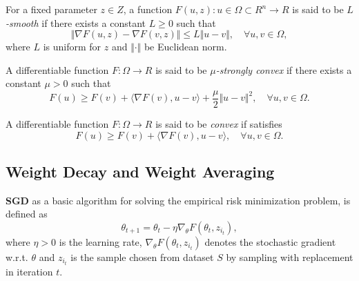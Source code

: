 \begin{definition}[$L$-smooth]
For a fixed parameter $z\in Z$, a function $F(u,z):u\in\Omega \subset R^n \rightarrow R$ is said to be \textit{$L$-smooth} if there exists a constant $L\geq 0$ such that 
    \begin{equation}\label{eq:beta-smooth}
     \Vert\nabla F(u,z)-\nabla F(v,z)\Vert \leq L\Vert u-v\Vert,\quad \forall u, v \in \Omega,
    \end{equation} 
where $L$ is uniform for $z$ and $\Vert\cdot\Vert$ be Euclidean norm.
\end{definition}

\begin{definition}
A differentiable function $F: \Omega \rightarrow R$ is said to be \textit{$\mu$-strongly convex} if there exists a constant $\mu >0$ such that
    \begin{equation}\label{eq:beta-smooth}
     F(u) \geq F(v) + \langle\nabla F(v), u-v \rangle + \frac{\mu}{2} \Vert u-v \Vert^2, \quad \forall u, v \in \Omega.
    \end{equation}   
\end{definition}

\begin{definition}
A differentiable function $F: \Omega \rightarrow R$ is said to be \textit{convex} if satisfies
    \begin{equation}\label{eq:convex-function}
     F(u) \geq F(v) + \langle\nabla F(v), u-v \rangle, \quad \forall u, v \in \Omega.
    \end{equation}  
\end{definition}

\subsection{Weight Decay and Weight Averaging}

\textbf{SGD} as a basic algorithm for solving the empirical risk minimization problem, is defined as 
\begin{equation}\label{SGD-rules}
   \theta_{t+1} = \theta_{t} - \eta \nabla_\theta F(\theta_{t},z_{i_t}),
\end{equation} 
where $\eta > 0 $ is the learning rate, $\nabla_\theta F(\theta_{t},z_{i_t})$ denotes the stochastic gradient w.r.t. $\theta$ and $z_{i_t}$ is the sample chosen from dataset $S$ by sampling with replacement in iteration $t$. 


